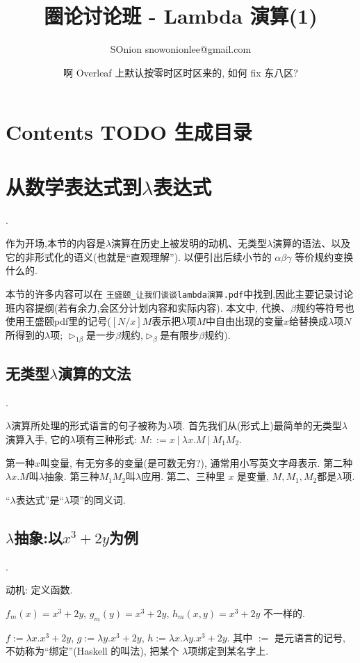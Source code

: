 \documentclass{article}
\title{圈论讨论班 - Lambda 演算(1)}
\author{SOnion snowonionlee@gmail.com}
\date{\DTMnow 啊 Overleaf 上默认按零时区时区来的, 如何 fix 东八区?}
\def\a{\alpha}
\def\b{\beta}
\def\c{\gamma}
\def\l{\lambda}
\begin{document}
	
\maketitle

\setcounter{section}{-1} %
\section{Contents TODO 生成目录}


\section{从数学表达式到$\l$表达式}
.

作为开场,本节的内容是$\l$演算在历史上被发明的动机、无类型$\l$演算的语法、以及它的非形式化的语义(也就是``直观理解''). 以便引出后续小节的 $\a\b\c$ 等价规约变换什么的.

本节的许多内容可以在 \verb!王盛颐_让我们谈谈lambda演算.pdf!中找到,因此主要记录讨论班内容提纲(若有余力,会区分计划内容和实际内容). 本文中, 代换、$\b$规约等符号也使用王盛颐pdf里的记号($[N/x]M$表示把$\l$项$M$中自由出现的变量$x$给替换成$\l$项$N$所得到的$\l$项; $\triangleright_{1\b}$是一步$\b$规约,$\triangleright_{\b}$是有限步$\b$规约).


\subsection{无类型$\l$演算的文法}
.

$\l$演算所处理的形式语言的句子被称为$\l$项. 首先我们从(形式上)最简单的无类型$\l$演算入手, 它的$\l$项有三种形式: $M ::= x~|~\l x.M~|~M_1 M_2$.

第一种$x$叫变量, 有无穷多的变量(是可数无穷?), 通常用小写英文字母表示. 第二种$\l x.M$叫$\l$抽象. 第三种$M_1 M_2$叫$\l$应用. 第二、三种里 $x$ 是变量, $M,M_1,M_2$都是$\l$项.

``$\l$表达式''是``$\l$项''的同义词.

\subsection{$\l$抽象:以$x^3+2y$为例}
.

动机: 定义函数.

$f_m(x)=x^3+2y$, $g_m(y)=x^3+2y$, $h_m(x,y)=x^3+2y$ 不一样的.

$f:=\l x.x^3+2y$, $g := \l y.x^3+2y$, $h:=\l x.\l y.x^3+2y$. 其中 $:=$ 是元语言的记号, 不妨称为``绑定''(Haskell 的叫法), 把某个 $\l$项绑定到某名字上.
\end{document}
